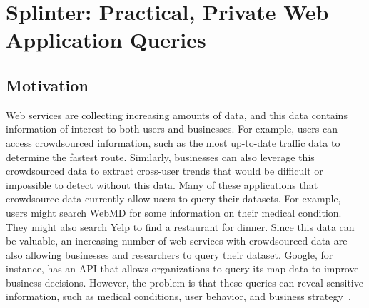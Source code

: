 \section{Splinter: Practical, Private Web Application Queries}
\label{chap:splinter}

\subsection{Motivation}

Web services are collecting increasing amounts
of data, and this data contains information of interest
to both users and businesses. For example,
users can access crowdsourced information,
such as the most up-to-date
traffic data to determine the fastest route.
Similarly, businesses can also leverage this crowdsourced data to extract
cross-user trends that would be difficult or impossible to
detect without this data.
Many of these applications that crowdsource data 
currently allow users to query their datasets. For example, users might search
WebMD for some information on their medical condition. 
They might also search Yelp to find a restaurant for dinner.
Since this data can be valuable, 
an increasing number of web services with crowdsourced data
are also allowing businesses and researchers to query
their dataset. Google, for instance, has an API that allows
organizations to query its map data to improve business decisions.
However, the problem is that 
these queries can reveal sensitive information,
such as medical conditions, user behavior, 
and business strategy~\cite{narayanan2010myths, narayanan2008robust}.


